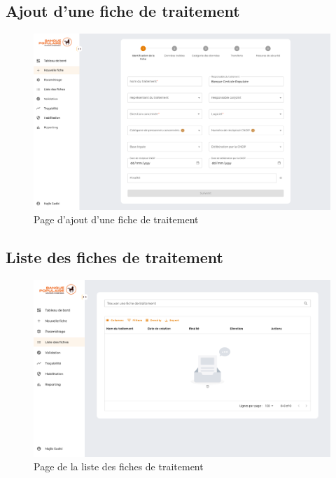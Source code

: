 \clearpage


\subsection{Ajout d'une fiche de traitement}

\begin{figure}[H]
    \centering
    \includegraphics[width=\textwidth]{images/formulaire-fiche.png}
    \caption{Page d'ajout d'une fiche de traitement}
\end{figure}

\clearpage


\subsection{Liste des fiches de traitement}

\begin{figure}[H]
    \centering
    \includegraphics[width=1.35\textwidth, angle=90]{images/fiches.png}
    \caption{Page de la liste des fiches de traitement}
\end{figure}

\clearpage






